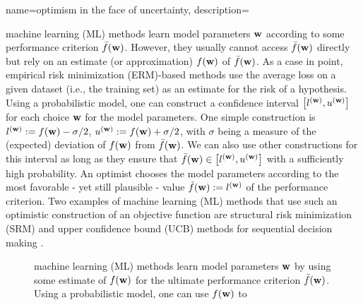 {name={optimism in the face of uncertainty},
	description={machine learning (ML) methods learn model parameters ${\bf w}$ 
		according to some performance criterion $\bar{f}({\bf w})$. However, they usually 
		cannot access $\bar{f}({\bf w})$ directly but rely on an estimate (or approximation) 
		$f({\bf w})$ of $\bar{f}({\bf w})$. As a case in point, empirical risk minimization (ERM)-based methods use 
		the average loss on a given dataset (i.e., the training set) as an estimate 
		for the risk of a hypothesis. Using a probabilistic model, one can construct 
		a confidence interval 
	$\big[ l^{({\bf w})},  u^{({\bf w})} \big]$ for each choice ${\bf w}$ for the model parameters.
		One simple construction is $l^{({\bf w})} := f({\bf w}) - \sigma/2$, $u^{({\bf w})} := f({\bf w})+ \sigma/2$, 
	    with $\sigma$ being a measure of the (expected) deviation of $f({\bf w})$ from $\bar{f}({\bf w})$.
	We can also use other constructions for this interval as long as they ensure that $\bar{f}({\bf w}) \in\big[ l^{({\bf w})},  u^{({\bf w})} \big]$ 
	with a sufficiently high probability. An optimist chooses the model parameters 
	according to the most favorable - yet still plausible - value $\tilde{f}({\bf w}) :=  l^{({\bf w})}$ 
	of the performance criterion. Two examples of machine learning (ML) methods that use such an optimistic 
	construction of an objective function are structural risk minimization (SRM) \cite[Ch. 11]{ShalevMLBook} and upper confidence bound (UCB) methods 
	for sequential decision making \cite[Sec. 2.2]{Bubeck2012}. 
		\begin{figure}[H]
				\begin{center}
\caption{machine learning (ML) methods learn model parameters ${\bf w}$ by using some estimate of $f({\bf w})$ for 
	the ultimate performance criterion $\bar{f}({\bf w})$. Using a probabilistic model, one can use $f({\bf w})$ to 
}
\end{center}
\end{figure}}}
